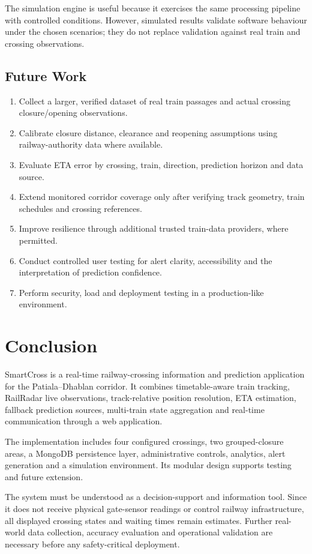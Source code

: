 \documentclass[11pt,a4paper]{report}
\begin{document}
The simulation engine is useful because it exercises the same processing pipeline with controlled conditions. However, simulated results validate software behaviour under the chosen scenarios; they do not replace validation against real train and crossing observations.

\section{Future Work}
\begin{enumerate}
  \item Collect a larger, verified dataset of real train passages and actual crossing closure/opening observations.
  \item Calibrate closure distance, clearance and reopening assumptions using railway-authority data where available.
  \item Evaluate ETA error by crossing, train, direction, prediction horizon and data source.
  \item Extend monitored corridor coverage only after verifying track geometry, train schedules and crossing references.
  \item Improve resilience through additional trusted train-data providers, where permitted.
  \item Conduct controlled user testing for alert clarity, accessibility and the interpretation of prediction confidence.
  \item Perform security, load and deployment testing in a production-like environment.
\end{enumerate}

\chapter{Conclusion}
SmartCross is a real-time railway-crossing information and prediction application for the Patiala--Dhablan corridor. It combines timetable-aware train tracking, RailRadar live observations, track-relative position resolution, ETA estimation, fallback prediction sources, multi-train state aggregation and real-time communication through a web application.

The implementation includes four configured crossings, two grouped-closure areas, a MongoDB persistence layer, administrative controls, analytics, alert generation and a simulation environment. Its modular design supports testing and future extension.

The system must be understood as a decision-support and information tool. Since it does not receive physical gate-sensor readings or control railway infrastructure, all displayed crossing states and waiting times remain estimates. Further real-world data collection, accuracy evaluation and operational validation are necessary before any safety-critical deployment.
\end{document}
